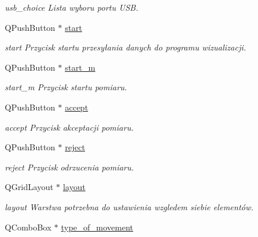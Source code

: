 \begin{DoxyCompactItemize}
\begin{DoxyCompactList}\small\item\em usb\-\_\-choice Lista wyboru portu U\-S\-B. \end{DoxyCompactList}\item 
\hypertarget{class_okno_ae7cda77331e084b73b3065c4cc5e46d2}{Q\-Push\-Button $\ast$ \hyperlink{class_okno_ae7cda77331e084b73b3065c4cc5e46d2}{start}}\label{class_okno_ae7cda77331e084b73b3065c4cc5e46d2}

\begin{DoxyCompactList}\small\item\em start Przycisk startu przesyłania danych do programu wizualizacji. \end{DoxyCompactList}\item 
\hypertarget{class_okno_a211a0bea332494946d0417ebb6c73ae3}{Q\-Push\-Button $\ast$ \hyperlink{class_okno_a211a0bea332494946d0417ebb6c73ae3}{start\-\_\-m}}\label{class_okno_a211a0bea332494946d0417ebb6c73ae3}

\begin{DoxyCompactList}\small\item\em start\-\_\-m Przycisk startu pomiaru. \end{DoxyCompactList}\item 
\hypertarget{class_okno_a4fe774bd293a9dd438b803279b1cdd3a}{Q\-Push\-Button $\ast$ \hyperlink{class_okno_a4fe774bd293a9dd438b803279b1cdd3a}{accept}}\label{class_okno_a4fe774bd293a9dd438b803279b1cdd3a}

\begin{DoxyCompactList}\small\item\em accept Przycisk akceptacji pomiaru. \end{DoxyCompactList}\item 
\hypertarget{class_okno_a70bd37b785ed16ce6db16f5b434ab75a}{Q\-Push\-Button $\ast$ \hyperlink{class_okno_a70bd37b785ed16ce6db16f5b434ab75a}{reject}}\label{class_okno_a70bd37b785ed16ce6db16f5b434ab75a}

\begin{DoxyCompactList}\small\item\em reject Przycisk odrzucenia pomiaru. \end{DoxyCompactList}\item 
\hypertarget{class_okno_a00ebd56e108eee1419ef68f9f68bfce3}{Q\-Grid\-Layout $\ast$ \hyperlink{class_okno_a00ebd56e108eee1419ef68f9f68bfce3}{layout}}\label{class_okno_a00ebd56e108eee1419ef68f9f68bfce3}

\begin{DoxyCompactList}\small\item\em layout Warstwa potrzebna do ustawienia wzgledem siebie elementów. \end{DoxyCompactList}\item 
\hypertarget{class_okno_aba409a1e85e08d5f5f0dea2ae784dd18}{Q\-Combo\-Box $\ast$ \hyperlink{class_okno_aba409a1e85e08d5f5f0dea2ae784dd18}{type\-\_\-of\-\_\-movement}}\label{class_okno_aba409a1e85e08d5f5f0dea2ae784dd18}


\end{DoxyCompactItemize}
